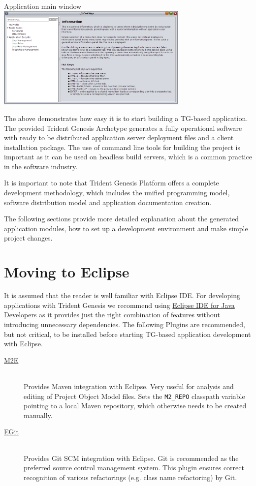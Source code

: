   \begin{image}{Application main window}{\label{img:ch00:02:client_main_window}}    
    \includegraphics[width=0.7\textwidth]{parts/00-part/chapters/01-application-modules/images/05-client-main-window.png}
  \end{image}

  The above demonstrates how easy it is to start building a TG-based application.
  The provided Trident Genesis Archetype generates a fully operational software with ready to be distributed application server deployment files and a client installation package.
  The use of command line tools for building the project is important as it can be used on headless build servers, which is a common practice in the software industry.

  It is important to note that Trident Genesis Platform offers a complete development methodology, which includes the unified programming model, software distribution model and application documentation creation.
  
  The following sections provide more detailed explanation about the generated application modules, how to set up a development environment and make simple project changes.

\section{Moving to Eclipse}
  It is assumed that the reader is well familiar with Eclipse IDE.
  For developing applications with Trident Genesis we recommend using \href{http://www.eclipse.org/downloads}{Eclipse IDE for Java Developers} as it provides just the right combination of features without introducing unnecessary dependencies.
  The following Plugins are recommended, but not critical, to be installed before starting TG-based application development with Eclipse.

  \begin{description}
    \item[\href{http://www.eclipse.org/m2e/}{M2E}] \hfill \\
	Provides Maven integration with Eclipse. 
	Very useful for analysis and editing of Project Object Model files.
	Sets the \texttt{M2\_REPO} classpath variable pointing to a local Maven repository, which otherwise needs to be created manually.
    \item[\href{http://www.eclipse.org/egit/}{EGit}] \hfill \\
	Provides Git SCM integration with Eclipse. 
	Git is recommended as the preferred source control management system. 
	This plugin ensures correct recognition of various refactorings (e.g. class name refactoring) by Git.
  \end{description}

